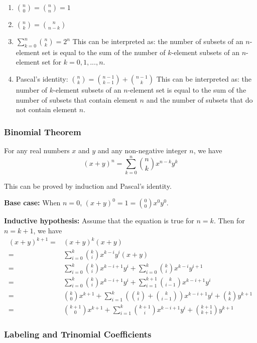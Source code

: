 \documentclass[a4paper,12pt]{article}
\begin{document}
\begin{enumerate}
	\item $\binom{n}{0} = \binom{n}{n} = 1$
	\item $\binom{n}{k} = \binom{n}{n-k}$
	\item $\sum_{k=0}^{n} \binom{n}{k} = 2^n$ This can be interpreted as: the number of subsets of an $n$-element set is equal to the sum of the number of $k$-element subsets of an $n$-element set for $k = 0, 1, ..., n$.
	\item Pascal's identity: $\binom{n}{k} = \binom{n-1}{k-1} + \binom{n-1}{k}$ This can be interpreted as: the number of $k$-element subsets of an $n$-element set is equal to the sum of the number of subsets that contain element $n$ and the number of subsets that do not contain element $n$.
\end{enumerate}

\subsubsection{Binomial Theorem}

For any real numbers $x$ and $y$ and any non-negative integer $n$, we have
\begin{equation*}
	(x+y)^n = \sum_{k=0}^{n} \binom{n}{k} x^{n-k} y^k
\end{equation*}

This can be proved by induction and Pascal's identity.

\textbf{Base case:}
When $n = 0$, $(x+y)^0 = 1 = \binom{0}{0} x^0 y^0$.

\textbf{Inductive hypothesis:}
Assume that the equation is true for $n = k$.
Then for $n = k+1$, we have
\begin{align*}
	(x+y)^{k+1} =& (x+y)^k (x+y) \\
	=& \sum_{i=0}^{k} \binom{k}{i} x^{k-i} y^i (x+y) \\
	=& \sum_{i=0}^{k} \binom{k}{i} x^{k-i+1} y^i + \sum_{i=0}^{k} \binom{k}{i} x^{k-i} y^{i+1} \\
	=& \sum_{i=0}^{k} \binom{k}{i} x^{k-i+1} y^i + \sum_{i=1}^{k+1} \binom{k}{i-1} x^{k-i+1} y^i \\
	=& \binom{k}{0} x^{k+1} + \sum_{i=1}^{k} \left( \binom{k}{i} + \binom{k}{i-1} \right) x^{k-i+1} y^i + \binom{k}{k} y^{k+1} \\
	=& \binom{k+1}{0} x^{k+1} + \sum_{i=1}^{k} \binom{k+1}{i} x^{k-i+1} y^i + \binom{k+1}{k+1} y^{k+1}
\end{align*}

\subsubsection{Labeling and Trinomial Coefficients}
\end{document}
